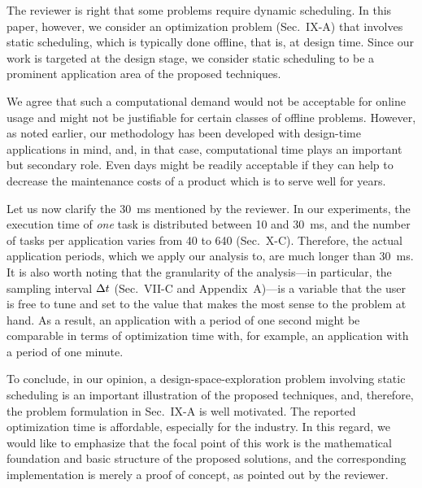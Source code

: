 \begin{authors}
The reviewer is right that some problems require dynamic scheduling. In this
paper, however, we consider an optimization problem (Sec.~IX-A) that involves
static scheduling, which is typically done offline, that is, at design time.
Since our work is targeted at the design stage, we consider static scheduling
to be a prominent application area of the proposed techniques.

We agree that such a computational demand would not be acceptable for online
usage and might not be justifiable for certain classes of offline problems.
However, as noted earlier, our methodology has been developed with design-time
applications in mind, and, in that case, computational time plays an important
but secondary role. Even days might be readily acceptable if they can help to
decrease the maintenance costs of a product which is to serve well for years.

Let us now clarify the 30~ms mentioned by the reviewer. In our experiments, the
execution time of \emph{one} task is distributed between 10 and 30~ms, and the
number of tasks per application varies from 40 to 640 (Sec.~X-C). Therefore,
the actual application periods, which we apply our analysis to, are much longer
than 30~ms. It is also worth noting that the granularity of the analysis---in
particular, the sampling interval $\Delta t$ (Sec.~VII-C and Appendix~A)---is a
variable that the user is free to tune and set to the value that makes the most
sense to the problem at hand. As a result, an application with a period of one
second might be comparable in terms of optimization time with, for example, an
application with a period of one minute.

To conclude, in our opinion, a design-space-exploration problem involving
static scheduling is an important illustration of the proposed techniques, and,
therefore, the problem formulation in Sec.~IX-A is well motivated. The reported
optimization time is affordable, especially for the industry. In this regard,
we would like to emphasize that the focal point of this work is the
mathematical foundation and basic structure of the proposed solutions, and the
corresponding implementation is merely a proof of concept, as pointed out by
the reviewer.

\begin{actions}
\end{actions}
\end{authors}

